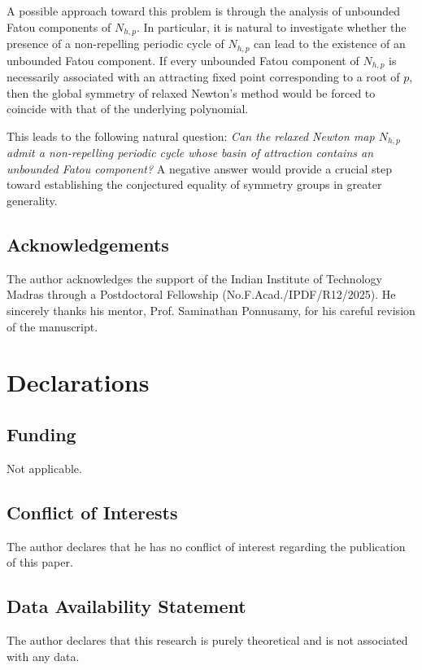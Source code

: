 \documentclass[12pt]{article}
\numberwithin{equation}{section}
\begin{document}
A possible approach toward this problem is through the analysis of unbounded Fatou components of $N_{h,p}$. In particular, it is natural to investigate whether the presence of a non-repelling periodic cycle of $N_{h,p}$ can lead to the existence of an unbounded Fatou component. If every unbounded Fatou component of $N_{h,p}$ is necessarily associated with an attracting fixed point corresponding to a root of $p$, then the global symmetry of relaxed Newton's method would be forced to coincide with that of the underlying polynomial.

This leads to the following natural question: \textit{Can the relaxed Newton map $N_{h,p}$ admit a non-repelling periodic cycle whose basin of attraction contains an unbounded Fatou component?} A negative answer would provide a crucial step toward establishing the conjectured equality of symmetry groups in greater generality.
\subsection*{Acknowledgements}The author acknowledges the support of the Indian Institute of Technology Madras through a Postdoctoral Fellowship (No.F.Acad./IPDF/R12/2025). He sincerely thanks his mentor, Prof. Saminathan Ponnusamy, for his careful revision of the manuscript.
\section{Declarations}
\subsection{Funding} Not applicable.

\subsection{Conflict of Interests}
The author declares that he has no conflict of interest regarding the publication of this paper.

\subsection{Data Availability Statement}
The author declares that this research is purely theoretical and is not associated with any data.
\end{document}
